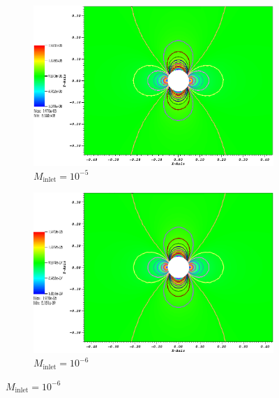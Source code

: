 \documentclass[preprint,10pt]{elsarticle}
\begin{document}
\begin{figure}[H]
        \begin{subfigure}[b]{0.495\textwidth}
                \centering
                \includegraphics[width=\textwidth]{CylinderMach1em5ZoomIn.png}
                \caption{$M_{\text{inlet}}=10^{-5}$}
                \label{fig:cyl_1em5}
        \end{subfigure}

        \begin{subfigure}[b]{0.495\textwidth}
                \centering
                \includegraphics[width=\textwidth]{CylinderMach1em6ZoomIn.png}
                \caption{$M_{\text{inlet}}=10^{-6}$}
                \label{fig:cyl_1em6}
        \end{subfigure}


\end{figure}
\end{document}
